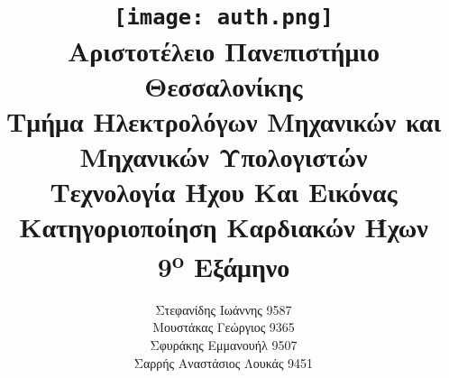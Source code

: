 \title{
	\texttt{[image: auth.png]}\\
	\large{Αριστοτέλειο Πανεπιστήμιο Θεσσαλονίκης}\\
	\large{Τμήμα Ηλεκτρολόγων Μηχανικών και Μηχανικών Υπολογιστών}\\
	\vspace{2cm}
	\LARGE{Τεχνολογία Ήχου Και Εικόνας\\Κατηγοριοποίηση Καρδιακών Ήχων}\\
	\vspace{0.5cm}
	\large{9\textsuperscript{o} Εξάμηνο}
	\vspace{3cm}
}

\author{
	Στεφανίδης Ιωάννης 9587\\
	Μουστάκας Γεώργιος 9365\\
	Σφυράκης Εμμανουήλ 9507\\
	Σαρρής Αναστάσιος Λουκάς 9451
	\vspace{3cm}
}
